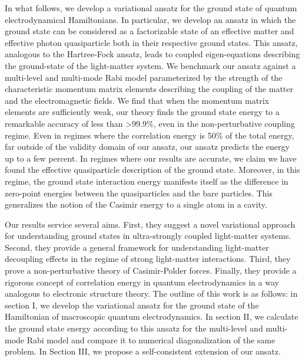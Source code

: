 \documentclass[aps,prb,twocolumn,
	groupedaddress,superscriptaddress,
	amsfonts,amssymb,amsmath,floatfix,
	citeautoscript]{revtex4-1}
\begin{document}
In what follows, we develop a variational ansatz for the ground state of quantum electrodynamical Hamiltonians. In particular, we develop an ansatz in which the ground state can be considered as a factorizable state of an effective matter and effective photon quasiparticle both in their respective ground states. This ansatz, analogous to the Hartree-Fock ansatz, leads to coupled eigen-equations describing the ground-state of the light-matter system. We benchmark our ansatz against a multi-level and multi-mode Rabi model parameterized by the strength of the characteristic momentum matrix elements describing the coupling of the matter and the electromagnetic fields. We find that when the momentum matrix elements are sufficiently weak, our theory finds the ground state energy to a remarkable accuracy of less than >99.9\%, even in the non-perturbative coupling regime. Even in regimes where the correlation energy is 50\% of the total energy, far outside of the validity domain of our ansatz, our ansatz predicts the energy up to a few percent. In regimes where our results are accurate, we claim we have found the effective quasiparticle description of the ground state. Moreover, in this regime, the ground state interaction energy manifests itself as the difference in zero-point energies between the quasiparticles and the bare particles. This generalizes the notion of the Casimir energy to a single atom in a cavity.

Our results service several aims. First, they suggest a novel variational approach for understanding ground states in ultra-strongly coupled light-matter systems. Second, they provide a general framework for understanding light-matter decoupling effects in the regime of strong light-matter interactions. Third, they prove a non-perturbative theory of Casimir-Polder forces. Finally, they provide a rigorous concept of correlation energy in quantum electrodynamics in a way analogous to electronic structure theory. 
The outline of this work is as follows: in section I, we develop the variational ansatz for the ground state of the Hamiltonian of macroscopic quantum electrodynamics. In section II, we calculate the ground state energy according to this ansatz for the multi-level and multi-mode Rabi model and compare it to numerical diagonalization of the same problem. In Section III, we propose a self-consistent extension of our ansatz. 
\end{document}
